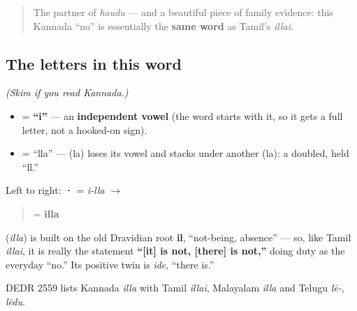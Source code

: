 \begin{quote}
The partner of \emph{haudu} — and a beautiful piece of family evidence: this Kannada \textquotedblleft{}no\textquotedblright{} is essentially the \textbf{same word} as Tamil's \emph{illai}.
\end{quote}

\subsection*{The letters in this word}
\emph{(Skim if you read Kannada.)}

\begin{itemize}
\raggedright
  \item \textbf{} = \textbf{\textquotedblleft{}i\textquotedblright{}} — an \textbf{independent vowel} (the word starts with it, so it gets a full letter, not a hooked-on sign).
  \item \textbf{} = \textquotedblleft{}lla\textquotedblright{} — \textbf{} (la) loses its vowel and stacks under another \textbf{} (la): a doubled, held \textquotedblleft{}ll.\textquotedblright{}
\end{itemize}

Left to right: \textbf{ · } = \emph{i-lla} $\to$

\begin{quote}
\textbf{} = \textbf{illa}
\end{quote}

\begin{cousinweb}
\textbf{} (\emph{illa}) is built on the old Dravidian root \textbf{il}, \textquotedblleft{}not-being, absence\textquotedblright{} — so, like Tamil \emph{illai}, it is really the statement \textbf{\textquotedblleft{}{[}it{]} is not, {[}there{]} is not,\textquotedblright{}} doing duty as the everyday \textquotedblleft{}no.\textquotedblright{} Its positive twin is \emph{ide}, \textquotedblleft{}there is.\textquotedblright{}

DEDR 2559 lists Kannada \emph{illa} with Tamil \emph{illai}, Malayalam \emph{illa} and Telugu \emph{lē-}, \emph{lēdu}.
\end{cousinweb}

